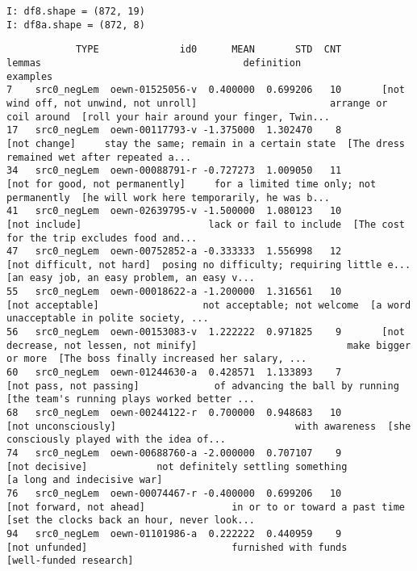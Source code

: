 \documentclass[a4paper,10pt,onecolumn,oneside,openright]{article}
\begin{document}
\begin{verbatim}
I: df8.shape = (872, 19)
I: df8a.shape = (872, 8)
\end{verbatim}
\begin{verbatim}
            TYPE              id0      MEAN       STD  CNT                                       lemmas                                   definition                                     examples
7    src0_negLem  oewn-01525056-v  0.400000  0.699206   10       [not wind off, not unwind, not unroll]                       arrange or coil around  [roll your hair around your finger, Twin...
17   src0_negLem  oewn-00117793-v -1.375000  1.302470    8                                 [not change]     stay the same; remain in a certain state  [The dress remained wet after repeated a...
34   src0_negLem  oewn-00088791-r -0.727273  1.009050   11              [not for good, not permanently]     for a limited time only; not permanently  [he will work here temporarily, he was b...
41   src0_negLem  oewn-02639795-v -1.500000  1.080123   10                                [not include]                      lack or fail to include  [The cost for the trip excludes food and...
47   src0_negLem  oewn-00752852-a -0.333333  1.556998   12                    [not difficult, not hard]  posing no difficulty; requiring little e...  [an easy job, an easy problem, an easy v...
55   src0_negLem  oewn-00018622-a -1.200000  1.316561   10                             [not acceptable]                  not acceptable; not welcome  [a word unacceptable in polite society, ...
56   src0_negLem  oewn-00153083-v  1.222222  0.971825    9       [not decrease, not lessen, not minify]                          make bigger or more  [The boss finally increased her salary, ...
60   src0_negLem  oewn-01244630-a  0.428571  1.133893    7                      [not pass, not passing]             of advancing the ball by running  [the team's running plays worked better ...
68   src0_negLem  oewn-00244122-r  0.700000  0.948683   10                          [not unconsciously]                               with awareness  [she consciously played with the idea of...
74   src0_negLem  oewn-00688760-a -2.000000  0.707107    9                               [not decisive]            not definitely settling something                  [a long and indecisive war]
76   src0_negLem  oewn-00074467-r -0.400000  0.699206   10                     [not forward, not ahead]               in or to or toward a past time  [set the clocks back an hour, never look...
94   src0_negLem  oewn-01101986-a  0.222222  0.440959    9                               [not unfunded]                         furnished with funds                       [well-funded research]

\end{verbatim}
\end{document}
